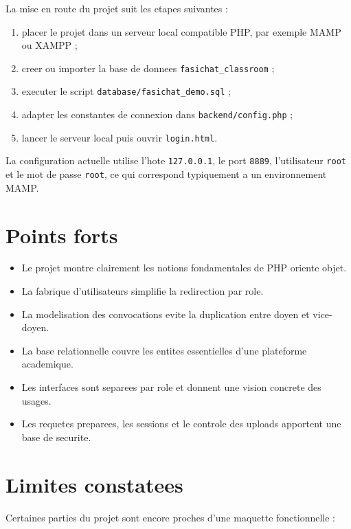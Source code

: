 \documentclass[12pt,a4paper]{article}
\begin{document}
La mise en route du projet suit les etapes suivantes :

\begin{enumerate}
    \item placer le projet dans un serveur local compatible PHP, par exemple MAMP ou XAMPP ;
    \item creer ou importer la base de donnees \texttt{fasichat\_classroom} ;
    \item executer le script \texttt{database/fasichat\_demo.sql} ;
    \item adapter les constantes de connexion dans \texttt{backend/config.php} ;
    \item lancer le serveur local puis ouvrir \texttt{login.html}.
\end{enumerate}

La configuration actuelle utilise l'hote \texttt{127.0.0.1}, le port \texttt{8889}, l'utilisateur \texttt{root} et le mot de passe \texttt{root}, ce qui correspond typiquement a un environnement MAMP.

\section{Points forts}

\begin{itemize}
    \item Le projet montre clairement les notions fondamentales de PHP oriente objet.
    \item La fabrique d'utilisateurs simplifie la redirection par role.
    \item La modelisation des convocations evite la duplication entre doyen et vice-doyen.
    \item La base relationnelle couvre les entites essentielles d'une plateforme academique.
    \item Les interfaces sont separees par role et donnent une vision concrete des usages.
    \item Les requetes preparees, les sessions et le controle des uploads apportent une base de securite.
\end{itemize}

\section{Limites constatees}

Certaines parties du projet sont encore proches d'une maquette fonctionnelle :
\end{document}
